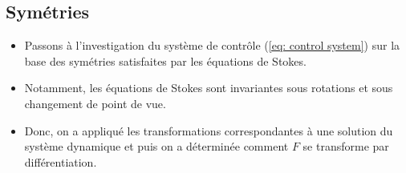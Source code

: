 \documentclass[12pt,a4paper]{article}
\theoremstyle{plain}
\theoremstyle{plain}
\theoremstyle{plain}
\theoremstyle{definition}
\theoremstyle{definition}
\theoremstyle{definition}
\theoremstyle{plain}
\newcommand{\M}{\mathcal{M}}
\newcommand{\R}{\mathbb{R}}
\DeclareMathOperator{\SO}{SO}
\begin{document}
\subsection{Symétries}

\begin{itemize}
\item Passons à l'investigation du système de contrôle (\ref{eq: control system}) sur la base des symétries satisfaites par les équations de Stokes.

\item Notamment, les équations de Stokes sont invariantes sous rotations et sous changement de point de vue.

\item Donc, on a appliqué les transformations correspondantes à une solution du système dynamique et puis on a déterminée comment $F$ se transforme par différentiation. 
\end{itemize}
\end{document}
